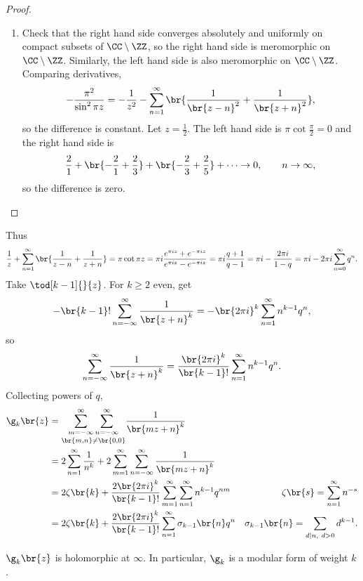 \begin{proof}
\begin{enumerate}
\pagebreak


\item Check that the right hand side converges absolutely and uniformly on compact subsets of $ \CC \setminus \ZZ $, so the right hand side is meromorphic on $ \CC \setminus \ZZ $. Similarly, the left hand side is also meromorphic on $ \CC \setminus \ZZ $. Comparing derivatives,
$$ -\dfrac{\pi^2}{\sin^2 \pi z} = -\dfrac{1}{z^2} - \sum_{n = 1}^\infty \br{\dfrac{1}{\br{z - n}^2} + \dfrac{1}{\br{z + n}^2}}, $$
so the difference is constant. Let $ z = \tfrac{1}{2} $. The left hand side is $ \pi\cot \tfrac{\pi}{2} = 0 $ and the right hand side is
$$ \dfrac{2}{1} + \br{-\dfrac{2}{1} + \dfrac{2}{3}} + \br{-\dfrac{2}{3} + \dfrac{2}{5}} + \dots \to 0, \qquad n \to \infty, $$
so the difference is zero.
\end{enumerate}
\end{proof}

Thus
$$ \dfrac{1}{z} + \sum_{n = 1}^\infty \br{\dfrac{1}{z - n} + \dfrac{1}{z + n}} = \pi\cot \pi z = \pi i\dfrac{e^{\pi iz} + e^{-\pi iz}}{e^{\pi iz} - e^{-\pi iz}} = \pi i\dfrac{q + 1}{q - 1} = \pi i - \dfrac{2\pi i}{1 - q} = \pi i - 2\pi i\sum_{n = 0}^\infty q^n. $$
Take $ \tod[k - 1]{}{z} $. For $ k \ge 2 $ even, get
$$ -\br{k - 1}!\sum_{n = -\infty}^\infty \dfrac{1}{\br{z + n}^k} = -\br{2\pi i}^k\sum_{n = 1}^\infty n^{k - 1}q^n, $$
so
$$ \sum_{n = -\infty}^\infty \dfrac{1}{\br{z + n}^k} = \dfrac{\br{2\pi i}^k}{\br{k - 1}!}\sum_{n = 1}^\infty n^{k - 1}q^n. $$
Collecting powers of $ q $,
\begin{align*}
\g_k\br{z}
& = \underset{\br{m, n} \ne \br{0, 0}}{\sum_{m = -\infty}^\infty \sum_{n = -\infty}^\infty} \dfrac{1}{\br{mz + n}^k} \\
& = 2\sum_{n = 1}^\infty \dfrac{1}{n^k} + 2\sum_{m = 1}^\infty \sum_{n = -\infty}^\infty \dfrac{1}{\br{mz + n}^k} \\
& = 2\zeta\br{k} + \dfrac{2\br{2\pi i}^k}{\br{k - 1}!}\sum_{m = 1}^\infty \sum_{n = 1}^\infty n^{k - 1}q^{nm} & \zeta\br{s} = \sum_{n = 1}^\infty n^{-s} \\
& = 2\zeta\br{k} + \dfrac{2\br{2\pi i}^k}{\br{k - 1}!}\sum_{n = 1}^\infty \sigma_{k - 1}\br{n}q^n & \sigma_{k - 1}\br{n} = \sum_{d \mid n, \ d > 0} d^{k - 1}.
\end{align*}

\begin{corollary}
$ \g_k\br{z} $ is holomorphic at $ \infty $. In particular, $ \g_k $ is a modular form of weight $ k $.
\end{corollary}

